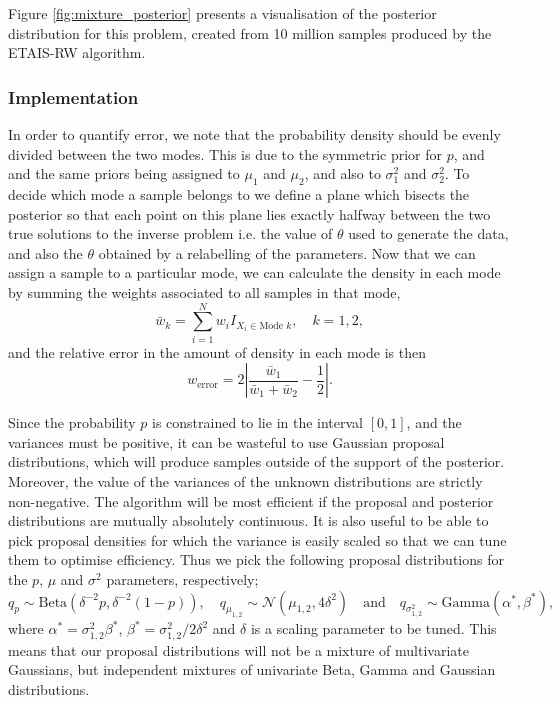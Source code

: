 \documentclass[final]{siamltex}
\begin{document}
Figure \ref{fig:mixture_posterior} presents a visualisation of the
posterior distribution for this problem, created from 10 million
samples produced by the ETAIS-RW algorithm.


\subsubsection{Implementation}
\label{sec:mixture_implementation}
{\red In order to quantify error, we note that} the probability density should
be evenly divided between the two modes. This is due to the symmetric
prior for $p$, and and the same priors being assigned to $\mu_1$ and
$\mu_2$, and also to $\sigma^2_1$ and $\sigma^2_2$. To decide which
mode a sample belongs to we define a plane which bisects the posterior
so that each point on this plane lies exactly halfway between the two
true solutions to the inverse problem i.e. the value of $\theta$ used
to generate the data, and also the $\theta$ obtained by a relabelling
of the parameters. Now that we can assign a sample to a particular
mode, we can calculate the density in each mode by summing the weights
associated to all samples in that mode,
\[
	\bar{w}_k = \sum\limits_{i=1}^N w_iI_{X_i \in \text{Mode $k$}}, \quad k = 1, 2,
\]
and the relative error in the amount of density in each mode is then
\begin{equation}\label{eqn:mode_prop}
	w_\text{error} = 2\left|\frac{\bar{w}_1}{\bar{w}_1+\bar{w}_2} - \frac{1}{2}\right|.
\end{equation}

Since the probability $p$ is constrained to lie in the interval
$[0,1]$, and the variances must be positive, it can be wasteful to use
Gaussian proposal distributions, {\red which will produce samples outside of
the support of the posterior. Moreover, the value of the variances of
the unknown distributions are strictly non-negative. The algorithm
will be most efficient if the proposal and posterior distributions are
mutually absolutely continuous. It is also useful to be able to pick
proposal densities for which the variance is easily scaled so that we
can tune them to optimise efficiency. Thus we pick the following
proposal distributions for the $p$, $\mu$ and $\sigma^2$ parameters, respectively;}
\[
	q_p \sim \text{Beta}(\delta^{-2}p, \delta^{-2}(1-p)), \quad q_{\mu_{1,2}} \sim \mathcal{N}(\mu_{1,2}, 4\delta^2) \quad \text{and} \quad q_{\sigma^2_{1,2}} \sim \text{Gamma}(\alpha^*, \beta^*),
\]
where $\alpha^* = \sigma^2_{1,2}\beta^*$, $\beta^* =
\sigma^2_{1,2}/2\delta^2$ and $\delta$ is a scaling parameter to be
tuned. This means that our proposal distributions will not be a
mixture of multivariate Gaussians, but independent mixtures of
univariate Beta, Gamma and Gaussian distributions.
\end{document}
